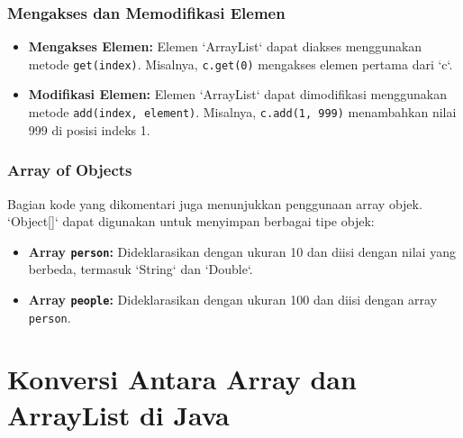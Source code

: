 \subsubsection{Mengakses dan Memodifikasi Elemen}

\begin{itemize}
	\item \textbf{Mengakses Elemen:} Elemen `ArrayList` dapat diakses menggunakan metode \texttt{get(index)}. Misalnya, \texttt{c.get(0)} mengakses elemen pertama dari `c`.
	\item \textbf{Modifikasi Elemen:} Elemen `ArrayList` dapat dimodifikasi menggunakan metode \texttt{add(index, element)}. Misalnya, \texttt{c.add(1, 999)} menambahkan nilai 999 di posisi indeks 1.
\end{itemize}

\subsubsection{Array of Objects}

Bagian kode yang dikomentari juga menunjukkan penggunaan array objek. `Object[]` dapat digunakan untuk menyimpan berbagai tipe objek:

\begin{itemize}
	\item \textbf{Array \texttt{person}:} Dideklarasikan dengan ukuran 10 dan diisi dengan nilai yang berbeda, termasuk `String` dan `Double`.
	\item \textbf{Array \texttt{people}:} Dideklarasikan dengan ukuran 100 dan diisi dengan array \texttt{person}.
\end{itemize}

\section{Konversi Antara Array dan ArrayList di Java}

